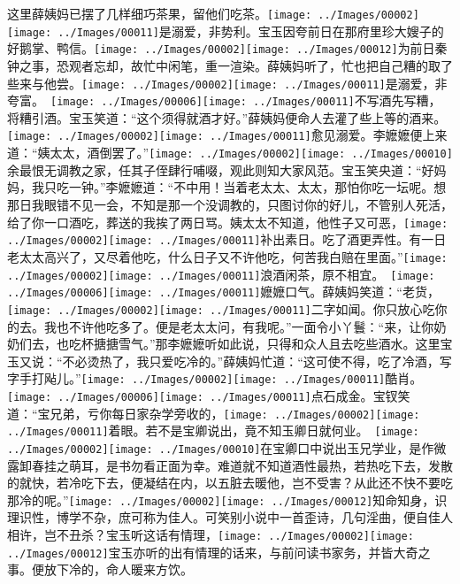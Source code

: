 这里薛姨妈已摆了几样细巧茶果，留他们吃茶。{\texttt{[image: ../Images/00002]}\texttt{[image: ../Images/00011]}\footnotesize \kaishu 是溺爱，非势利。}宝玉因夸前日在那府里珍大嫂子的好鹅掌、鸭信。{\texttt{[image: ../Images/00002]}\texttt{[image: ../Images/00012]}\footnotesize \kaishu 为前日秦钟之事，恐观者忘却，故忙中闲笔，重一渲染。}薛姨妈听了，忙也把自己糟的取了些来与他尝。{{\texttt{[image: ../Images/00002]}\texttt{[image: ../Images/00011]}\footnotesize \kaishu 是溺爱，非夸富。　}\texttt{[image: ../Images/00006]}\texttt{[image: ../Images/00011]}\footnotesize \kaishu 不写酒先写糟，将糟引酒。}宝玉笑道：``这个须得就酒才好。''薛姨妈便命人去灌了些上等的酒来。{\texttt{[image: ../Images/00002]}\texttt{[image: ../Images/00011]}\footnotesize \kaishu 愈见溺爱。}李嬷嬷便上来道：``姨太太，酒倒罢了。''{\texttt{[image: ../Images/00002]}\texttt{[image: ../Images/00010]}\footnotesize \kaishu 余最恨无调教之家，任其子侄肆行哺啜，观此则知大家风范。}宝玉笑央道：``好妈妈，我只吃一钟。''李嬷嬷道：``不中用！当着老太太、太太，那怕你吃一坛呢。想那日我眼错不见一会，不知是那一个没调教的，只图讨你的好儿，不管别人死活，给了你一口酒吃，葬送的我挨了两日骂。姨太太不知道，他性子又可恶，{\texttt{[image: ../Images/00002]}\texttt{[image: ../Images/00011]}\footnotesize \kaishu 补出素日。}吃了酒更弄性。有一日老太太高兴了，又尽着他吃，什么日子又不许他吃，何苦我白赔在里面。''{{\texttt{[image: ../Images/00002]}\texttt{[image: ../Images/00011]}\footnotesize \kaishu 浪酒闲茶，原不相宜。　}\texttt{[image: ../Images/00006]}\texttt{[image: ../Images/00011]}\footnotesize \kaishu 嬷嬷口气。}薛姨妈笑道：``老货，{\texttt{[image: ../Images/00002]}\texttt{[image: ../Images/00011]}\footnotesize \kaishu 二字如闻。}你只放心吃你的去。我也不许他吃多了。便是老太太问，有我呢。''一面令小丫鬟：``来，让你奶奶们去，也吃杯搪搪雪气。''那李嬷嬷听如此说，只得和众人且去吃些酒水。这里宝玉又说：``不必烫热了，我只爱吃冷的。''薛姨妈忙道：``这可使不得，吃了冷酒，写字手打飐儿。''{{\texttt{[image: ../Images/00002]}\texttt{[image: ../Images/00011]}\footnotesize \kaishu 酷肖。　}\texttt{[image: ../Images/00006]}\texttt{[image: ../Images/00011]}\footnotesize \kaishu 点石成金。}宝钗笑道：``宝兄弟，亏你每日家杂学旁收的，{\texttt{[image: ../Images/00002]}\texttt{[image: ../Images/00011]}\footnotesize \kaishu 着眼。若不是宝卿说出，竟不知玉卿日就何业。　\texttt{[image: ../Images/00002]}\texttt{[image: ../Images/00010]}\footnotesize \kaishu 在宝卿口中说出玉兄学业，是作微露卸春挂之萌耳，是书勿看正面为幸。}难道就不知道酒性最热，若热吃下去，发散的就快，若冷吃下去，便凝结在内，以五脏去暖他，岂不受害？从此还不快不要吃那冷的呢。''{\texttt{[image: ../Images/00002]}\texttt{[image: ../Images/00012]}\footnotesize \kaishu 知命知身，识理识性，博学不杂，庶可称为佳人。可笑别小说中一首歪诗，几句淫曲，便自佳人相许，岂不丑杀？}宝玉听这话有情理，{\texttt{[image: ../Images/00002]}\texttt{[image: ../Images/00012]}\footnotesize \kaishu 宝玉亦听的出有情理的话来，与前问读书家务，并皆大奇之事。}便放下冷的，命人暖来方饮。

